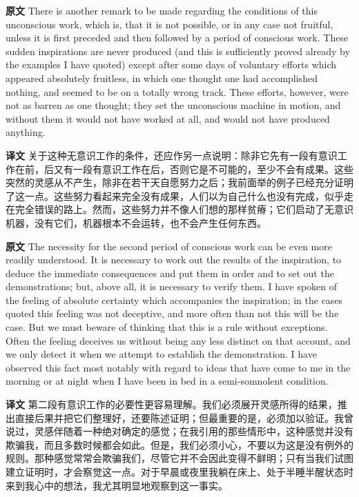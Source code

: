 \documentclass[UTF8,zihao=-4]{ctexart}
\newcommand{\BodyFont}{\fontsize{10.5pt}{15.5pt}\selectfont}
\newcommand{\origlabel}{\textbf{原文}\quad}
\newcommand{\translabel}{\textbf{译文}\quad}
\newenvironment{enblock}{\par\noindent\begingroup\BodyFont\origlabel}{\par\endgroup}
\newenvironment{zhblock}{\par\noindent\begingroup\BodyFont\translabel}{\par\endgroup\vspace{0.35em}}
\begin{document}
\begin{enblock}
There is another remark to be made regarding the conditions of this unconscious work, which is, that it is not possible, or in any case not fruitful, unless it is first preceded and then followed by a period of conscious work. These sudden inspirations are never produced (and this is sufficiently proved already by the examples I have quoted) except after some days of voluntary efforts which appeared absolutely fruitless, in which one thought one had accomplished nothing, and seemed to be on a totally wrong track. These efforts, however, were not as barren as one thought; they set the unconscious machine in motion, and without them it would not have worked at all, and would not have produced anything.
\end{enblock}
\begin{zhblock}
关于这种无意识工作的条件，还应作另一点说明：除非它先有一段有意识工作在前，后又有一段有意识工作在后，否则它是不可能的，至少不会有成果。这些突然的灵感从不产生，除非在若干天自愿努力之后；我前面举的例子已经充分证明了这一点。这些努力看起来完全没有成果，人们以为自己什么也没有完成，似乎走在完全错误的路上。然而，这些努力并不像人们想的那样贫瘠；它们启动了无意识机器，没有它们，机器根本不会运转，也不会产生任何东西。\end{zhblock}

\begin{enblock}
The necessity for the second period of conscious work can be even more readily understood. It is necessary to work out the results of the inspiration, to deduce the immediate consequences and put them in order and to set out the demonstrations; but, above all, it is necessary to verify them. I have spoken of the feeling of absolute certainty which accompanies the inspiration; in the cases quoted this feeling was not deceptive, and more often than not this will be the case. But we must beware of thinking that this is a rule without exceptions. Often the feeling deceives us without being any less distinct on that account, and we only detect it when we attempt to establish the demonstration. I have observed this fact most notably with regard to ideas that have come to me in the morning or at night when I have been in bed in a semi-somnolent condition.
\end{enblock}
\begin{zhblock}
第二段有意识工作的必要性更容易理解。我们必须展开灵感所得的结果，推出直接后果并把它们整理好，还要陈述证明；但最重要的是，必须加以验证。我曾说过，灵感伴随着一种绝对确定的感觉；在我引用的那些情形中，这种感觉并没有欺骗我，而且多数时候都会如此。但是，我们必须小心，不要以为这是没有例外的规则。那种感觉常常会欺骗我们，尽管它并不会因此变得不鲜明；只有当我们试图建立证明时，才会察觉这一点。对于早晨或夜里我躺在床上、处于半睡半醒状态时来到我心中的想法，我尤其明显地观察到这一事实。\end{zhblock}
\end{document}
